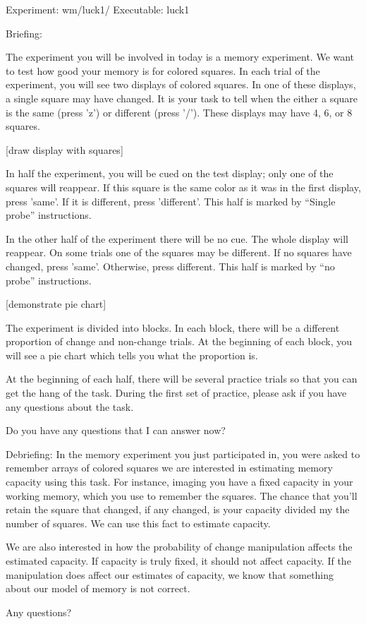 Experiment: wm/luck1/
Executable: luck1

Briefing:

The experiment you will be involved in today is a memory
experiment. We want to test how good your memory is for colored
squares. In each trial of the experiment, you will see two displays of
colored squares. In one of these displays, a single square may have
changed.
 It is your task to tell when the
either a square is the same (press 'z') or different (press
'/'). These displays may have 4, 6, or 8 squares.

[draw display with squares]

In half the experiment, you will be cued on the test display; only one
of the squares
will reappear. If this square is the same color as it was in the first
display, press 'same'. If it is different,
press 'different'. This half is marked by ``Single probe''
instructions.
 
In the other half of the experiment there will be no cue. The whole
display will reappear. 
On some trials one of the squares may be different. If no squares have
changed, press 'same'. Otherwise, press different.
This half is marked by ``no probe'' instructions.

[demonstrate pie chart]

The experiment is divided into blocks. In each block, there will be a
different proportion of change and non-change trials. At the beginning
of each block, you will see a pie chart which tells you what the
proportion is. 

At the beginning of each half, there will be several practice
trials so that you can get the hang of the task. During the first set
of practice, please ask if you have any questions about the task.

Do you have any questions that I can answer now?


Debriefing:
In the memory experiment you just participated in, you were asked to
remember arrays of colored squares we are interested in estimating
memory capacity using this task. For instance, imaging you have a
fixed capacity in your working memory, which you use to remember the
squares. The chance that you'll retain the square that changed, if any
changed, is your capacity divided my the number of squares. We can use
this fact to estimate capacity. 

We are also interested in how the probability of change manipulation
affects the estimated capacity. If capacity is truly fixed, it should
not affect capacity. If the manipulation does affect our estimates of
capacity, we know that something about our model of memory is not
correct.

Any questions?
